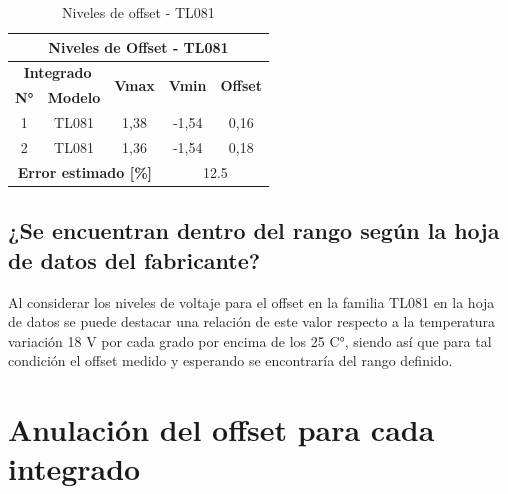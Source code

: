 \documentclass[conference]{IEEEtran}
\begin{document}
	\begin{table}[]
		\centering
		\begin{tabular}{|ccccc|}
			\hline
			\multicolumn{5}{|c|}{\textbf{Niveles de Offset - TL081}}                                                                                                                                                                \\ \hline
			\multicolumn{2}{|c|}{\textbf{Integrado}}                                 & \multicolumn{1}{c|}{\multirow{2}{*}{\textbf{Vmax}}} & \multicolumn{1}{c|}{\multirow{2}{*}{\textbf{Vmin}}} & \multirow{2}{*}{\textbf{Offset}} \\ \cline{1-2}
			\multicolumn{1}{|c|}{\textbf{N°}} & \multicolumn{1}{c|}{\textbf{Modelo}} & \multicolumn{1}{c|}{}                               & \multicolumn{1}{c|}{}                               &                                  \\ \hline
			\multicolumn{1}{|c|}{1}           & \multicolumn{1}{c|}{TL081}           & \multicolumn{1}{c|}{1,38}                           & \multicolumn{1}{c|}{-1,54}                          & 0,16                             \\ \hline
			\multicolumn{1}{|c|}{2}           & \multicolumn{1}{c|}{TL081}           & \multicolumn{1}{c|}{1,36}                           & \multicolumn{1}{c|}{-1,54}                          & 0,18                             \\ \hline
			\multicolumn{3}{|c|}{\textbf{Error estimado {[}\%{]}}}                                                                         & \multicolumn{2}{c|}{12.5}                                                              \\ \hline
		\end{tabular}
		\caption{Niveles de offset - TL081}
		\label{tab:offset-tl081}
	\end{table}
	
	\subsection{¿Se encuentran dentro del rango según la hoja de datos del fabricante?}
	Al considerar los niveles de voltaje para el offset en la familia TL081 en la hoja de datos se puede destacar una relación de este valor respecto a la temperatura variación 18 V por cada grado por encima de los 25 C°, siendo así que para tal condición el offset medido y esperando se encontraría del rango definido.
	
	\section{Anulación del offset para cada integrado}
	
\end{document}
